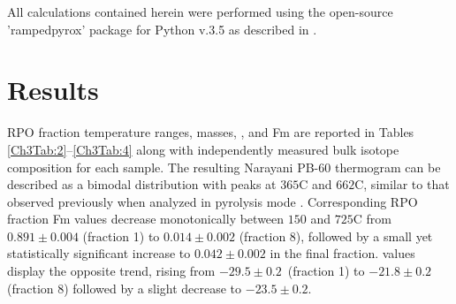All calculations contained herein were performed using the open-source 'rampedpyrox' package for Python v.3.5 as described in \citet{Hemingway:bA3-kvLz}.

\section{Results}

RPO fraction temperature ranges,  masses, , and Fm are reported in Tables \ref{Ch3Tab:2}--\ref{Ch3Tab:4} along with independently measured bulk isotope composition for each sample. The resulting Narayani PB-60 thermogram can be described as a bimodal distribution with peaks at $365$\textdegree C and $662$\textdegree C, similar to that observed previously when analyzed in pyrolysis mode \citep[Figure \ref{Ch3Fig:2}A;][]{Rosenheim:2012kh}. Corresponding RPO fraction Fm values decrease monotonically between $150$ and $725$\textdegree C from $0.891 \pm 0.004$ (fraction 1) to $0.014 \pm 0.002$ (fraction 8), followed by a small yet statistically significant increase to $0.042 \pm 0.002$ in the final fraction.  values display the opposite trend, rising from $-29.5 \pm 0.2$\textperthousand\ (fraction 1) to $-21.8 \pm 0.2$\textperthousand (fraction 8) followed by a slight decrease to $-23.5 \pm 0.2$\textperthousand. 

